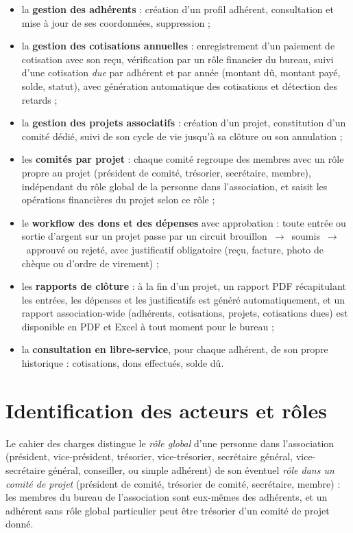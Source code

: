 \begin{itemize}
  \item la \textbf{gestion des adhérents} : création d'un profil adhérent,
    consultation et mise à jour de ses coordonnées, suppression ;
  \item la \textbf{gestion des cotisations annuelles} : enregistrement d'un
    paiement de cotisation avec son reçu, vérification par un rôle financier
    du bureau, suivi d'une cotisation \emph{due} par adhérent et par année
    (montant dû, montant payé, solde, statut), avec génération automatique
    des cotisations et détection des retards ;
  \item la \textbf{gestion des projets associatifs} : création d'un projet,
    constitution d'un comité dédié, suivi de son cycle de vie jusqu'à sa
    clôture ou son annulation ;
  \item les \textbf{comités par projet} : chaque comité regroupe des membres
    avec un rôle propre au projet (président de comité, trésorier,
    secrétaire, membre), indépendant du rôle global de la personne dans
    l'association, et saisit les opérations financières du projet selon ce
    rôle ;
  \item le \textbf{workflow des dons et des dépenses} avec approbation :
    toute entrée ou sortie d'argent sur un projet passe par un circuit
    brouillon~$\rightarrow$~soumis~$\rightarrow$~approuvé ou rejeté, avec
    justificatif obligatoire (reçu, facture, photo de chèque ou d'ordre de
    virement) ;
  \item les \textbf{rapports de clôture} : à la fin d'un projet, un rapport
    PDF récapitulant les entrées, les dépenses et les justificatifs est
    généré automatiquement, et un rapport association-wide (adhérents,
    cotisations, projets, cotisations dues) est disponible en PDF et Excel
    à tout moment pour le bureau ;
  \item la \textbf{consultation en libre-service}, pour chaque adhérent, de
    son propre historique : cotisations, dons effectués, solde dû.
\end{itemize}

\section{Identification des acteurs et rôles}

Le cahier des charges distingue le \emph{rôle global} d'une personne dans
l'association (président, vice-président, trésorier, vice-trésorier,
secrétaire général, vice-secrétaire général, conseiller, ou simple adhérent)
de son éventuel \emph{rôle dans un comité de projet} (président de comité,
trésorier de comité, secrétaire, membre) : les membres du bureau de
l'association sont eux-mêmes des adhérents, et un adhérent sans rôle global
particulier peut être trésorier d'un comité de projet donné.


